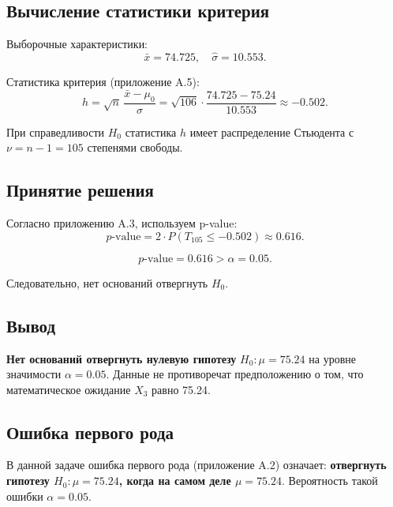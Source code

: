 \subsection{Вычисление статистики критерия}

Выборочные характеристики:
\[
\bar{x} = 74.725, \quad \hat{\sigma} = 10.553.
\]

Статистика критерия (приложение A.5):
\[
h = \sqrt{n} \, \frac{\bar{x} - \mu_0}{\hat{\sigma}}
= \sqrt{106} \cdot \frac{74.725 - 75.24}{10.553}
\approx -0.502.
\]

При справедливости \(H_0\) статистика \(h\) имеет распределение Стьюдента с \(\nu = n - 1 = 105\) степенями свободы.

\subsection{Принятие решения}

Согласно приложению A.3, используем p-value:
\[
p\text{-value} = 2 \cdot P(T_{105} \leq -0.502) \approx 0.616.
\]

\[
p\text{-value} = 0.616 > \alpha = 0.05.
\]

Следовательно, нет оснований отвергнуть \(H_0\).

\subsection{Вывод}

\textbf{Нет оснований отвергнуть нулевую гипотезу} \(H_0: \mu = 75.24\) на уровне значимости \(\alpha = 0.05\). Данные не противоречат предположению о том, что математическое ожидание \(X_3\) равно 75.24.

\subsection{Ошибка первого рода}

В данной задаче ошибка первого рода (приложение A.2) означает: \textbf{отвергнуть гипотезу \(H_0: \mu = 75.24\), когда на самом деле \(\mu = 75.24\)}. Вероятность такой ошибки \(\alpha = 0.05\).
